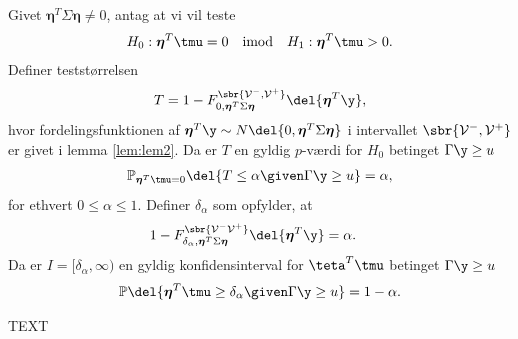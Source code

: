 %
\begin{lem} \label{lem:lem3}
Givet \(\boldsymbol{\eta}^T \Sigma \boldsymbol{\eta} \neq 0\), antag at vi vil teste
\begin{align*}
H_0: \boldsymbol{\eta}^T \tmu=0 \quad \text{imod} \quad H_1: \boldsymbol{\eta}^T \tmu > 0.
\end{align*}
Definer teststørrelsen
\begin{align}
T=1- F_{0, \boldsymbol{\eta}^T \Sigma \boldsymbol{\eta}}^{\sbr{\mathcal{V}^-, \mathcal{V}^+}} \del{\boldsymbol{\eta}^T \y}, \label{eq:post_1.14}
\end{align}
hvor fordelingsfunktionen af \(\boldsymbol{\eta}^T \y \sim N \del{0,  \boldsymbol{\eta}^T \Sigma \boldsymbol{\eta}}\) i intervallet \(\sbr{\mathcal{V}^-, \mathcal{V}^+}\) er givet i lemma \ref{lem:lem2}.
Da er \(T\) en gyldig \(p\)-værdi for \(H_0\) betinget \(\Gamma \y \geq u\)
\begin{align}
\mathbb{P}_{\boldsymbol{\eta}^T \tmu=0} \del{T \leq \alpha \given \Gamma \y \geq u} = \alpha, \label{eq:post_1.15}
\end{align}
for ethvert \(0 \leq \alpha \leq 1\). 
Definer \(\delta_{\alpha}\) som opfylder, at
\begin{align*}
1-F_{\delta_{\alpha}, \boldsymbol{\eta}^T \Sigma \boldsymbol{\eta}}^{\sbr{\mathcal{V}^- \mathcal{V}^+}} \del{\boldsymbol{\eta}^T \y} &= \alpha.
\end{align*}
Da er \(I= [\delta_\alpha, \infty )\) en gyldig konfidensinterval for \(\teta^T \tmu\) betinget \(\Gamma \y \geq u\)
\begin{align*}
\mathbb{P} \del{\boldsymbol{\eta}^T \tmu \geq \delta_\alpha \given \Gamma \y \geq u} = 1- \alpha.
\end{align*}
\end{lem}
%
TEXT

